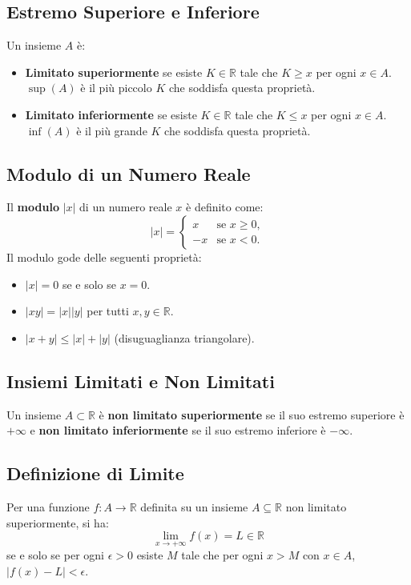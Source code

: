 \documentclass{book}
\begin{document}
\subsection*{Estremo Superiore e Inferiore}
Un insieme \( A \) è:
\begin{itemize}
  \item \textbf{Limitato superiormente} se esiste \( K \in \mathbb{R} \) tale che \( K \geq x \) per ogni \( x \in A \). \( \sup(A) \) è il più piccolo \( K \) che soddisfa questa proprietà.
  \item \textbf{Limitato inferiormente} se esiste \( K \in \mathbb{R} \) tale che \( K \leq x \) per ogni \( x \in A \). \( \inf(A) \) è il più grande \( K \) che soddisfa questa proprietà.
\end{itemize}

\subsection*{Modulo di un Numero Reale}
Il \textbf{modulo} \( |x| \) di un numero reale \( x \) è definito come:
\[
  |x| =
  \begin{cases}
    x  & \text{se } x \geq 0, \\
    -x & \text{se } x < 0.
  \end{cases}
\]
Il modulo gode delle seguenti proprietà:
\begin{itemize}
  \item \( |x| = 0 \) se e solo se \( x = 0 \).
  \item \( |xy| = |x||y| \) per tutti \( x, y \in \mathbb{R} \).
  \item \( |x+y| \leq |x| + |y| \) (disuguaglianza triangolare).
\end{itemize}

\subsection*{Insiemi Limitati e Non Limitati}
Un insieme \( A \subset \mathbb{R} \) è \textbf{non limitato superiormente} se il suo estremo superiore è \( +\infty \) e \textbf{non limitato inferiormente} se il suo estremo inferiore è \( -\infty \).

\subsection*{Definizione di Limite}
Per una funzione \( f: A \to \mathbb{R} \) definita su un insieme \( A \subseteq \mathbb{R} \) non limitato superiormente, si ha:
\[
  \lim_{x \to +\infty} f(x) = L \in \mathbb{R}
\]
se e solo se per ogni \( \epsilon > 0 \) esiste \( M \) tale che per ogni \( x > M \) con \( x \in A \), \( |f(x) - L| < \epsilon \).
\end{document}
